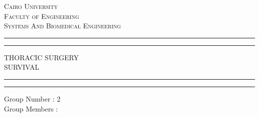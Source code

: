 \documentclass[a4paper, 11pt, oneside]{article} %
\begin{document}
 




\begin{titlepage} %




	\centering %
	
	\scshape %
	
	\vspace*{\baselineskip} %
	\vspace{0.5\baselineskip} %
	
	{\scshape\Large Cairo University\\ Faculty of Engineering\\Systems And Biomedical Engineering\\} %

	
	\rule{\textwidth}{1.6pt}\vspace*{-\baselineskip}\vspace*{2pt} %
	\rule{\textwidth}{0.4pt} %
	
	\vspace{0.75\baselineskip} %
	
	{\LARGE THORACIC   SURGERY\\ SURVIVAL\\} %
	
	\vspace{0.75\baselineskip} %
	
	\rule{\textwidth}{0.4pt}\vspace*{-\baselineskip}\vspace{3.2pt} %
	\rule{\textwidth}{1.6pt} %
	
	\vspace{2\baselineskip} %
	
	
	
	Group Number : 2\\
         \vspace{2\baselineskip} 
        Group Members :
	

\end{titlepage}
\end{document}
